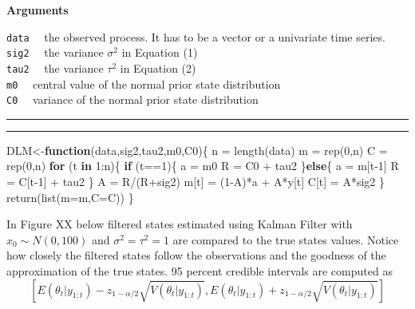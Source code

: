 \documentclass[
]{book}
\newenvironment{Shaded}{\begin{snugshade}}{\end{snugshade}}
\newcommand{\AttributeTok}[1]{\textcolor[rgb]{0.77,0.63,0.00}{#1}}
\newcommand{\ControlFlowTok}[1]{\textcolor[rgb]{0.13,0.29,0.53}{\textbf{#1}}}
\newcommand{\DecValTok}[1]{\textcolor[rgb]{0.00,0.00,0.81}{#1}}
\newcommand{\FunctionTok}[1]{\textcolor[rgb]{0.00,0.00,0.00}{#1}}
\newcommand{\NormalTok}[1]{#1}
\newcommand{\OtherTok}[1]{\textcolor[rgb]{0.56,0.35,0.01}{#1}}
\newcommand{\SpecialCharTok}[1]{\textcolor[rgb]{0.00,0.00,0.00}{#1}}
\theoremstyle{break}
\theoremstyle{nonumberplain}
\begin{document}
\textbf{Arguments}

\texttt{data} ~~the observed process. It has to be a vector or a
univariate time series.\\
\texttt{sig2} ~~the variance \(\sigma^{2}\) in Equation (1)\\
\texttt{tau2} ~~the variance \(\tau^{2}\) in Equation (2)\\
\texttt{m0} ~~central value of the normal prior state distribution\\
\texttt{C0} ~~variance of the normal prior state distribution

\hrule
\hrule

\begin{Shaded}
\begin{Highlighting}[]
\NormalTok{DLM}\OtherTok{\textless{}{-}}\ControlFlowTok{function}\NormalTok{(data,sig2,tau2,m0,C0)\{}
\NormalTok{  n  }\OtherTok{=} \FunctionTok{length}\NormalTok{(data)}
\NormalTok{  m  }\OtherTok{=} \FunctionTok{rep}\NormalTok{(}\DecValTok{0}\NormalTok{,n)}
\NormalTok{  C  }\OtherTok{=} \FunctionTok{rep}\NormalTok{(}\DecValTok{0}\NormalTok{,n)}
  \ControlFlowTok{for}\NormalTok{ (t }\ControlFlowTok{in} \DecValTok{1}\SpecialCharTok{:}\NormalTok{n)\{}
    \ControlFlowTok{if}\NormalTok{ (t}\SpecialCharTok{==}\DecValTok{1}\NormalTok{)\{}
\NormalTok{      a }\OtherTok{=}\NormalTok{ m0}
\NormalTok{      R }\OtherTok{=}\NormalTok{ C0 }\SpecialCharTok{+}\NormalTok{ tau2}
\NormalTok{    \}}\ControlFlowTok{else}\NormalTok{\{}
\NormalTok{      a }\OtherTok{=}\NormalTok{ m[t}\DecValTok{{-}1}\NormalTok{]}
\NormalTok{      R }\OtherTok{=}\NormalTok{ C[t}\DecValTok{{-}1}\NormalTok{] }\SpecialCharTok{+}\NormalTok{ tau2}
\NormalTok{    \}}
\NormalTok{    A }\OtherTok{=}\NormalTok{ R}\SpecialCharTok{/}\NormalTok{(R}\SpecialCharTok{+}\NormalTok{sig2)}
\NormalTok{    m[t] }\OtherTok{=}\NormalTok{ (}\DecValTok{1}\SpecialCharTok{{-}}\NormalTok{A)}\SpecialCharTok{*}\NormalTok{a }\SpecialCharTok{+}\NormalTok{ A}\SpecialCharTok{*}\NormalTok{y[t]}
\NormalTok{    C[t] }\OtherTok{=}\NormalTok{ A}\SpecialCharTok{*}\NormalTok{sig2}
\NormalTok{  \}}
  \FunctionTok{return}\NormalTok{(}\FunctionTok{list}\NormalTok{(}\AttributeTok{m=}\NormalTok{m,}\AttributeTok{C=}\NormalTok{C))}
\NormalTok{\}}
\end{Highlighting}
\end{Shaded}

In Figure XX below filtered states estimated using Kalman Filter with
\(x_{0} \sim N(0,100)\) and \(\sigma^{2}=\tau^{2}=1\) are compared to
the true states values. Notice how closely the filtered states follow
the observations and the goodness of the approximation of the true
states. 95 percent credible intervals are computed as
\[[E(\theta_{t}|y_{1:t})-z_{1-\alpha/2}\sqrt{V(\theta_{t}|y_{1:t})},E(\theta_{t}|y_{1:t})+z_{1-\alpha/2}\sqrt{V(\theta_{t}|y_{1:t})}]\]
\end{document}
